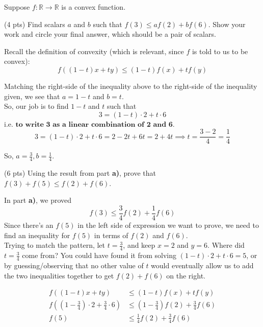 \documentclass[11pt]{article}
\begin{document}
\newpage

\begin{prob}
Suppose $f: \mathbb{R} \to \mathbb{R}$ is a convex function.

\begin{subprob}(4 pts) Find scalars $a$ and $b$ such that $f(3) \leq a f(2) + b f(6)$. Show your work and $\boxed{\text{circle}}$ your final answer, which should be a pair of scalars.

\emptybox{7cm}

\begin{solution}
Recall the definition of convexity (which is relevant, since $f$ is told to us to be convex):
$$
f((1-t) x + ty) \leq (1-t) f(x) + t f(y)
$$

Matching the right-side of the inequality above to the right-side of the inequality given, we see that $a = 1-t$ and $b = t$. \\

So, our job is to find $1-t$ and $t$ such that $$3 = (1-t) \cdot 2 + t \cdot 6$$ i.e. $\textbf{to write 3 as a linear combination of 2 and 6}$. \\

$$3 = (1 - t) \cdot 2 + t \cdot 6 = 2 - 2t + 6t = 2 + 4t \implies t = \frac{3 - 2}{4} = \frac{1}{4}$$

So, $\boxed{a = \frac{3}{4}, b = \frac{1}{4}}$.
\end{solution}
\end{subprob}

\begin{subprob}(6 pts) Using the result from part \textbf{a)}, prove that $f(3) + f(5) \leq f(2) + f(6)$.

\emptybox{11cm}

\begin{solution}
In part \textbf{a)}, we proved
$$
f(3) \leq \frac{3}{4} f(2) + \frac{1}{4} f(6)
$$
Since there's an $f(5)$ in the left side of expression we want to prove, we need to find an inequality for $f(5)$ in terms of $f(2)$ and $f(6)$. \\

Trying to match the pattern, let $t = \frac{3}{4}$, and keep $x = 2$ and $y = 6$. Where did $t = \frac{3}{4}$ come from? You could have found it from solving $(1-t) \cdot 2 + t \cdot 6 = 5$, or by guessing/observing that no other value of $t$ would eventually allow us to add the two inequalities together to get $f(2) + f(6)$ on the right.

\begin{align*}
f((1-t)x + ty) &\leq (1-t)f(x) + t f(y) \\
f\left( (1-\frac{3}{4}) \cdot 2 + \frac{3}{4} \cdot 6 \right) &\leq (1-\frac{3}{4}) f(2) + \frac{3}{4} f(6) \\
f(5) &\leq \frac{1}{4} f(2) + \frac{3}{4} f(6)
\end{align*}


\end{solution}
\end{subprob}
\end{prob}
\end{document}
